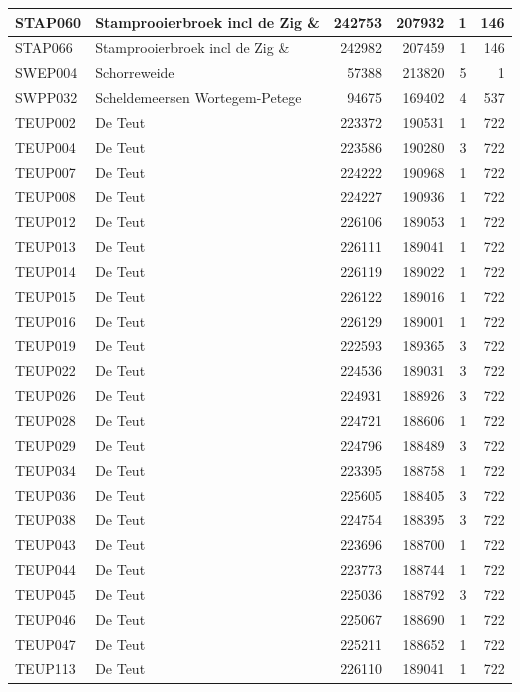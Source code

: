 \documentclass[11pt,]{book}
\begin{document}
\begin{table}
\begin{tabular}[t]{l|l|r|r|r|r}
\hline
STAP060 & Stamprooierbroek incl de Zig \& & 242753 & 207932 & 1 & 146\\
\hline
STAP066 & Stamprooierbroek incl de Zig \& & 242982 & 207459 & 1 & 146\\
\hline
SWEP004 & Schorreweide & 57388 & 213820 & 5 & 1\\
\hline
SWPP032 & Scheldemeersen Wortegem-Petege & 94675 & 169402 & 4 & 537\\
\hline
TEUP002 & De Teut & 223372 & 190531 & 1 & 722\\
\hline
TEUP004 & De Teut & 223586 & 190280 & 3 & 722\\
\hline
TEUP007 & De Teut & 224222 & 190968 & 1 & 722\\
\hline
TEUP008 & De Teut & 224227 & 190936 & 1 & 722\\
\hline
TEUP012 & De Teut & 226106 & 189053 & 1 & 722\\
\hline
TEUP013 & De Teut & 226111 & 189041 & 1 & 722\\
\hline
TEUP014 & De Teut & 226119 & 189022 & 1 & 722\\
\hline
TEUP015 & De Teut & 226122 & 189016 & 1 & 722\\
\hline
TEUP016 & De Teut & 226129 & 189001 & 1 & 722\\
\hline
TEUP019 & De Teut & 222593 & 189365 & 3 & 722\\
\hline
TEUP022 & De Teut & 224536 & 189031 & 3 & 722\\
\hline
TEUP026 & De Teut & 224931 & 188926 & 3 & 722\\
\hline
TEUP028 & De Teut & 224721 & 188606 & 1 & 722\\
\hline
TEUP029 & De Teut & 224796 & 188489 & 3 & 722\\
\hline
TEUP034 & De Teut & 223395 & 188758 & 1 & 722\\
\hline
TEUP036 & De Teut & 225605 & 188405 & 3 & 722\\
\hline
TEUP038 & De Teut & 224754 & 188395 & 3 & 722\\
\hline
TEUP043 & De Teut & 223696 & 188700 & 1 & 722\\
\hline
TEUP044 & De Teut & 223773 & 188744 & 1 & 722\\
\hline
TEUP045 & De Teut & 225036 & 188792 & 3 & 722\\
\hline
TEUP046 & De Teut & 225067 & 188690 & 1 & 722\\
\hline
TEUP047 & De Teut & 225211 & 188652 & 1 & 722\\
\hline
TEUP113 & De Teut & 226110 & 189041 & 1 & 722\\

\end{tabular}
\end{table}
\end{document}
